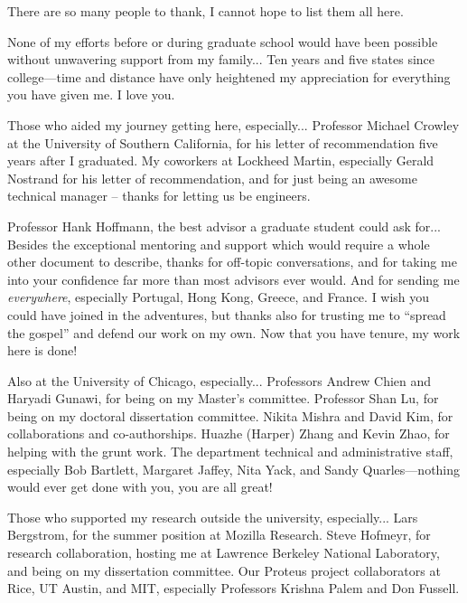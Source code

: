 There are so many people to thank, I cannot hope to list them all here.

None of my efforts before or during graduate school would have been possible without unwavering support from my family...
Ten years and five states since college---time and distance have only heightened my appreciation for everything you have given me.
I love you.

Those who aided my journey getting here, especially...
Professor Michael Crowley at the University of Southern California, for his letter of recommendation five years after I graduated.
My coworkers at Lockheed Martin, especially Gerald Nostrand for his letter of recommendation, and for just being an awesome technical manager -- thanks for letting us be engineers.

Professor Hank Hoffmann, the best advisor a graduate student could ask for...
Besides the exceptional mentoring and support which would require a whole other document to describe, thanks for off-topic conversations, and for taking me into your confidence far more than most advisors ever would.
And for sending me \emph{everywhere}, especially Portugal, Hong Kong, Greece, and France.
I wish you could have joined in the adventures, but thanks also for trusting me to ``spread the gospel'' and defend our work on my own.
Now that you have tenure, my work here is done!

Also at the University of Chicago, especially...
Professors Andrew Chien and Haryadi Gunawi, for being on my Master's committee.
Professor Shan Lu, for being on my doctoral dissertation committee.
Nikita Mishra and David Kim, for collaborations and co-authorships.
Huazhe (Harper) Zhang and Kevin Zhao, for helping with the grunt work.
The department technical and administrative staff, especially Bob Bartlett, Margaret Jaffey, Nita Yack, and Sandy Quarles---nothing would ever get done with you, you are all great!

Those who supported my research outside the university, especially...
Lars Bergstrom, for the summer position at Mozilla Research.
Steve Hofmeyr, for research collaboration, hosting me at Lawrence Berkeley National Laboratory, and being on my dissertation committee.
Our Proteus project collaborators at Rice, UT Austin, and MIT, especially Professors Krishna Palem and Don Fussell.

